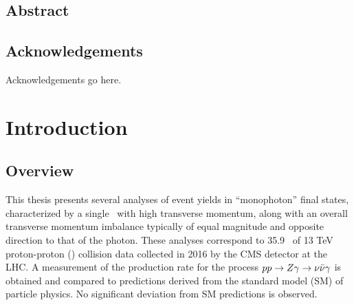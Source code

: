 \documentclass[oneside, letterpaper, 12pt, oldfontcommands]{memoir}
\begin{document}
\frontmatter


\thetitlepage
\clearpage

\thecopyrightpage
\cleardoublepage

\setcounter{page}{1}

\section{Abstract}
\uwabstract
\cleardoublepage

\section{Acknowledgements}
Acknowledgements go here.
\clearpage

\tableofcontents* %
\clearpage
\listoffigures  %

\mainmatter

\chapter{Introduction} \label{chap:introduction}
\section{Overview} \label{sec:introduction_overview}
This thesis presents several analyses of event
yields in ``monophoton'' final states, characterized by a single \Pgamma\ with high transverse
momentum, along with an overall transverse momentum imbalance typically of equal magnitude and opposite direction to
that of the photon.
These analyses correspond to 35.9 \fbinv\ of 13 TeV proton-proton (\Pp\Pp) collision data collected in 2016 by the CMS
detector at the LHC. A measurement of the production rate for the process $pp \to Z\gamma \to \nu\bar{\nu}\gamma$ is obtained
and compared to predictions derived from the standard model (SM) of particle physics. No significant deviation from SM
predictions is observed.
\end{document}
